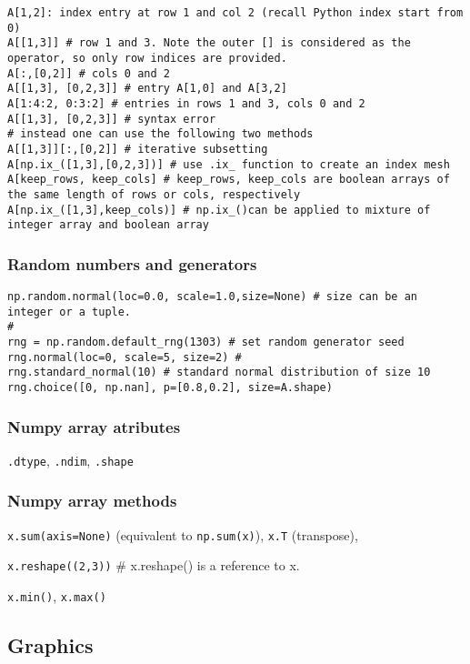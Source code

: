 \documentclass[
  letterpaper,
  DIV=11,
  numbers=noendperiod]{scrreprt}
\begin{document}
\begin{verbatim}
A[1,2]: index entry at row 1 and col 2 (recall Python index start from 0)
A[[1,3]] # row 1 and 3. Note the outer [] is considered as the operator, so only row indices are provided. 
A[:,[0,2]] # cols 0 and 2
A[[1,3], [0,2,3]] # entry A[1,0] and A[3,2]
A[1:4:2, 0:3:2] # entries in rows 1 and 3, cols 0 and 2
A[[1,3], [0,2,3]] # syntax error
# instead one can use the following two methods 
A[[1,3]][:,[0,2]] # iterative subsetting
A[np.ix_([1,3],[0,2,3])] # use .ix_ function to create an index mesh
A[keep_rows, keep_cols] # keep_rows, keep_cols are boolean arrays of the same length of rows or cols, respectively
A[np.ix_([1,3],keep_cols)] # np.ix_()can be applied to mixture of integer array and boolean array
\end{verbatim}

\subsubsection{Random numbers and
generators}\label{random-numbers-and-generators}

\begin{verbatim}
np.random.normal(loc=0.0, scale=1.0,size=None) # size can be an integer or a tuple.
# 
rng = np.random.default_rng(1303) # set random generator seed
rng.normal(loc=0, scale=5, size=2) # 
rng.standard_normal(10) # standard normal distribution of size 10
rng.choice([0, np.nan], p=[0.8,0.2], size=A.shape)
\end{verbatim}

\subsubsection{Numpy array atributes}\label{numpy-array-atributes}

\texttt{.dtype}, \texttt{.ndim}, \texttt{.shape}

\subsubsection{Numpy array methods}\label{numpy-array-methods}

\texttt{x.sum(axis=None)} (equivalent to \texttt{np.sum(x)}),
\texttt{x.T} (transpose),

\texttt{x.reshape((2,3))} \# x.reshape() is a reference to x.

\texttt{x.min()}, \texttt{x.max()}

\subsection{Graphics}\label{graphics}
\end{document}
